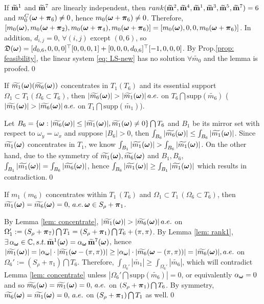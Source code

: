 If $\mrow{1}$ and $\mrow{7}$ are linearly independent, then $rank(\mrow{2},\mrow{4},\mrow{1},\mrow{3},\mrow{5},\mrow{7}) = 6$ and $m_0^C(\V{\omega}+\V{\pi}_6)\neq 0$, hence $m_0(\V{\omega}+\V{\pi}_6)\neq 0$. Therefore, $[m_0(\V{\omega}),m_0(\V{\omega}+\V{\pi}_2),m_0(\V{\omega}+\V{\pi}_4),m_0(\V{\omega}+\V{\pi}_6)] = [m_0(\V{\omega}),0,0,m_0(\V{\omega}+\V{\pi}_6)]$. In addition, $d_{i,j} = 0,\, \forall(i,j)$ except $(0,6)$, so $\mathfrak{D}(\V{\omega}) = [d_{0,6}, 0, 0,0]^\top [0,0,0,1] + [0,0,0,d_{0,6}]^\top [-1,0,0,0]$.  By Prop.\ref{prop: feasibility}, the linear system \eqref{eq: LS-new} has no solution $\forall \widetilde{m_0}$ and the lemma is proofed.\qed
\begin{lemma}\label{lem: concentrate}
If $\m{1} (\m{6})$ concentrates in $T_1 (T_6)$ and its essential support $\Omega_1\subset T_1 (\Omega_6\subset T_6)$, then $|\m{6}| > |\m{1}|\, a.e.$ on $T_6\bigcap \text{supp}(\widetilde{m_6})$ ($|\m{1}| > |\m{6}|\,a.e.$ on $T_1\bigcap\text{supp}(\widetilde{m_1})$).
\end{lemma}
Let $B_6=\{\V{\omega}: |\m{6}| \leq |\m{1}|, \m{1}\neq 0\}\bigcap T_6$ and $B_1$ be its mirror set with respect to $\omega_y = \omega_x$ and suppose $|B_6|>0$, then $\int_{B_6}|\m{6}|\leq \int_{B_6}|\m{1}|$. Since $\m{1}$ concentrates in $T_1$, we know $\int_{B_1}|\m{1}| > \int_{B_6}|\m{1}|$. On the other hand, due to the symmetry of $\m{1},\m{6}$ and $B_1,B_6$, $\int_{B_1}|\m{1}| = \int_{B_6}|\m{6}|$, hence $\int_{B_6}|\m{1}| \geq \int_{B_1}|\m{1}| $ which results in contradiction.\qed

\begin{proposition}
If  $m_1\,(m_6)$ concentrates within $T_1\,(T_6)$ and $\Omega_1\subset T_1\,(\Omega_6\subset T_6)$, then $\m{1} = \m{6} = 0,\, a.e. \,\V{\omega}\in S_\rho + \V{\pi}_1$.
\end{proposition}
By Lemma \ref{lem: concentrate}, $|\m{1}| > |\m{6}|\, a.e.$ on $\Omega_1':= (S_\rho + \V{\pi}_7)\bigcap T_1 = (S_\rho+\V{\pi}_1)\bigcap T_6+(\pi,\pi)$. By Lemma \ref{lem: rank1}, $\exists\,\alpha_{\V{\omega}}\in\mathbb{C}, s.t.\,\mrow{1}(\V{\omega}) = \alpha_{\V{\omega}}\,\mrow{7}(\V{\omega})$, hence $|\widetilde{m_1}(\V{\omega})| = |\alpha_{\V{\omega}}|\cdot|\widetilde{m_1}(\V{\omega}-(\pi,\pi))| \geq |\alpha_{\V{\omega}}|\cdot|\widetilde{m_6}(\V{\omega}-(\pi,\pi))| = |\m{6}|, a.e. $ on $\Omega_6':= (S_\rho+\pi_1)\bigcap T_6$. Therefore, $\int_{\Omega_6'}|\widetilde{m_1}| \geq \int_{\Omega_6'}|\widetilde{m_6}|$, which will contradict Lemma \ref{lem: concentrate} unless $|\Omega_6'\bigcap\text{supp}(\widetilde{m_6})| = 0$, or equivalently $\alpha_{\V{\omega}}=0$ and so $\m{6} = \m{1} = 0,\,a.e.$ on $(S_\rho+\V{\pi}_1)\bigcap T_6$. By symmetry, $\m{6}=\m{1} = 0,\,a.e. $ on $(S_\rho+\V{\pi}_1)\bigcap T_1$ as well.\qed


